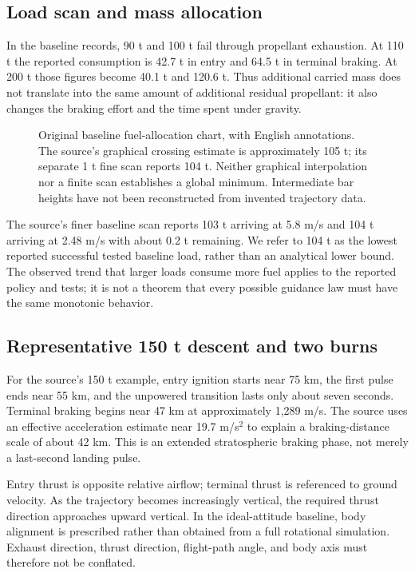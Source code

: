 \documentclass[11pt,a4paper]{article}
\begin{document}
\subsection{Load scan and mass allocation}


In the baseline records, 90 t and 100 t fail through propellant exhaustion. At 110 t the reported consumption is 42.7 t in entry and 64.5 t in terminal braking. At 200 t those figures become 40.1 t and 120.6 t. Thus additional carried mass does not translate into the same amount of additional residual propellant: it also changes the braking effort and the time spent under gravity.

\begin{figure}[htbp]
\centering\SourceFuelPlot
\caption{Original baseline fuel-allocation chart, with English annotations. The source's graphical crossing estimate is approximately 105 t; its separate 1 t fine scan reports 104 t. Neither graphical interpolation nor a finite scan establishes a global minimum. Intermediate bar heights have not been reconstructed from invented trajectory data.}
\label{fig:fuel}
\end{figure}

The source's finer baseline scan reports 103 t arriving at 5.8 m/s and 104 t arriving at 2.48 m/s with about 0.2 t remaining. We refer to 104 t as the lowest reported successful tested baseline load, rather than an analytical lower bound. The observed trend that larger loads consume more fuel applies to the reported policy and tests; it is not a theorem that every possible guidance law must have the same monotonic behavior.

\subsection{Representative 150 t descent and two burns}


For the source's 150 t example, entry ignition starts near 75 km, the first pulse ends near 55 km, and the unpowered transition lasts only about seven seconds. Terminal braking begins near 47 km at approximately 1,289 m/s. The source uses an effective acceleration estimate near 19.7 m/s$^2$ to explain a braking-distance scale of about 42 km. This is an extended stratospheric braking phase, not merely a last-second landing pulse.




Entry thrust is opposite relative airflow; terminal thrust is referenced to ground velocity. As the trajectory becomes increasingly vertical, the required thrust direction approaches upward vertical. In the ideal-attitude baseline, body alignment is prescribed rather than obtained from a full rotational simulation. Exhaust direction, thrust direction, flight-path angle, and body axis must therefore not be conflated.
\end{document}
